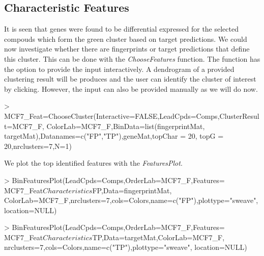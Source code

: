 \documentclass[a4paper]{article}
\begin{document}
\subsection{Characteristic Features}
It is seen that genes were found to be differential expressed for the selected
compouds which form the green cluster based on target predictions. We could now
investigate whether there are fingerprints or target predictions that define
this cluster. This can be done with the {\it ChooseFeatures} function. The
function has the option to provide the input interactively. A dendrogram of a
provided clustering result will be produces and the user can identify the
cluster of interest by clicking. However, the input can also be provided
manually as we will do now.
\begin{Schunk}
\begin{Sinput}
> MCF7_Feat=ChooseCluster(Interactive=FALSE,LeadCpds=Comps,ClusterResult=MCF7_F,
                         ColorLab=MCF7_F,BinData=list(fingerprintMat,
                         targetMat),Datanames=c("FP","TP"),geneMat,topChar = 20,
                         topG = 20,nrclusters=7,N=1)
\end{Sinput}
\end{Schunk}
\noindent We plot the top identified features with the {\it FeaturesPlot}.
\begin{Schunk}
\begin{Sinput}
> BinFeaturesPlot(LeadCpds=Comps,OrderLab=MCF7_F,Features=
                 MCF7_Feat$Characteristics$FP,Data=fingerprintMat,
                 ColorLab=MCF7_F,nrclusters=7,cols=Colors,name=c("FP"),plottype="sweave",
                 location=NULL)
\end{Sinput}
\end{Schunk}
\begin{Schunk}
\begin{Sinput}
> BinFeaturesPlot(LeadCpds=Comps,OrderLab=MCF7_F,Features=
                 MCF7_Feat$Characteristics$TP,Data=targetMat,ColorLab=MCF7_F,
                 nrclusters=7,cols=Colors,name=c("TP"),plottype="sweave",
                 location=NULL)
\end{Sinput}
\end{Schunk}
\end{document}
